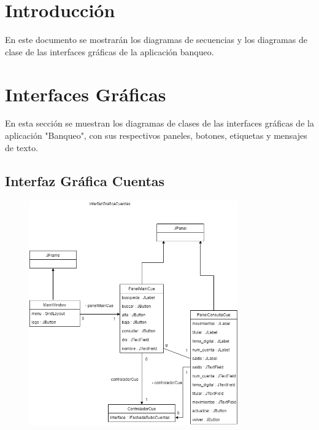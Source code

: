 \documentclass[12pt]{article}
\begin{document}
\section*{Introducción} %
En este documento se mostrarán los diagramas de secuencias y los diagramas de clase de las interfaces gráficas de la aplicación banqueo.

\section{Interfaces Gráficas} %
En esta sección se muestran los diagramas de clases de las interfaces gráficas de la aplicación "Banqueo", con sus respectivos paneles, botones, etiquetas y mensajes de texto.

\subsection{Interfaz Gráfica Cuentas}
\begin{figure}[H]
    \centering
    \includegraphics[width=0.8\textwidth]{images/InterfazGraficaCuentas1.png}
\end{figure}
\end{document}
